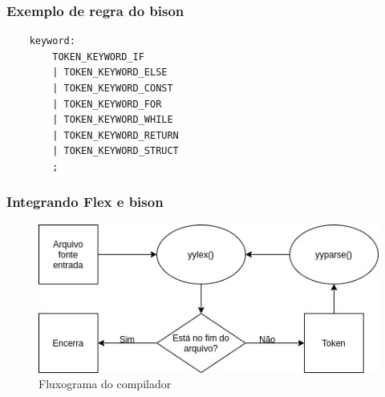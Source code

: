 \documentclass[12pt]{beamer}
\begin{document}
\begin{frame}[t,fragile]{\insertsectionhead}
    \frametitle{Exemplo de regra do bison}

    \begin{center}
        
    \begin{lstlisting}
    keyword:
	    TOKEN_KEYWORD_IF
	    | TOKEN_KEYWORD_ELSE
	    | TOKEN_KEYWORD_CONST
	    | TOKEN_KEYWORD_FOR
	    | TOKEN_KEYWORD_WHILE
	    | TOKEN_KEYWORD_RETURN
	    | TOKEN_KEYWORD_STRUCT
	    ;
    \end{lstlisting}
    \end{center}
    
\end{frame}

\begin{frame}
    \frametitle{Integrando Flex e bison}
    \begin{figure}[!htb]
        \centering
        \includegraphics[width=\textwidth]{fluxo}
        \caption{\label{fig:fluxo}Fluxograma do compilador}
    \end{figure}
\end{frame}
\end{document}
